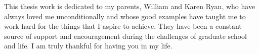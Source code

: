 \documentclass[
11pt, 
english,
singlespacing,
headsepline,
]{MastersDoctoralThesis}
\begin{document}

This thesis work is dedicated to my parents, William and Karen Ryan, who have always loved me unconditionally and whose good examples have taught me to work hard for the things that I aspire to achieve. They have been a constant source of support and encouragement during the challenges of graduate school and life. I am truly thankful for having you in my life.


\mainmatter %

\pagestyle{thesis} %



% 
%
% 
% 


\appendix %



%
%


\printbibliography[heading=bibintoc]

\end{document}
